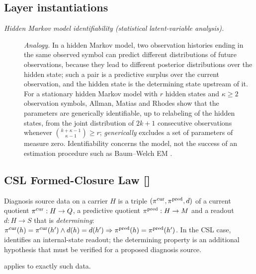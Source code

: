 \subsection*{Layer instantiations}\label{layer-inst:F13a}

\begingroup\small
\begin{description}
\item[\emph{Hidden Markov model identifiability (statistical
latent-variable analysis).}] \textit{Analogy.}
In a hidden Markov model, two observation histories ending in the
same observed symbol can predict different distributions of future
observations, because they lead to different posterior distributions
over the hidden state; such a pair is a predictive surplus over the
current observation, and the hidden state is the determining state
upstream of it.  For a stationary hidden Markov model with \(r\) hidden
states and \(\kappa\ge2\) observation symbols, Allman, Matias and
Rhodes show that the parameters are generically identifiable, up to
relabeling of the hidden states, from the joint distribution of
\(2k+1\) consecutive observations whenever
\(\binom{k+\kappa-1}{\kappa-1}\ge r\); \emph{generically}
excludes a set of parameters of measure zero.  Identifiability concerns
the model, not the success of an estimation procedure such as
Baum--Welch EM \citep{AllmanMatiasRhodes2009Identifiability}.

\end{description}
\endgroup


\subsection{CSL Formed-Closure Law [\texorpdfstring{}{F13b}]}\label{sec:access:csl-formed-closure}

\begin{definition}\label{def:diagnosis-source}
Diagnosis source data on a carrier \(H\) is a triple \((\pi^{\mathrm{cur}},\pi^{\mathrm{pred}},d)\) of
a current quotient \(\pi^{\mathrm{cur}}:H\to Q\), a predictive quotient
\(\pi^{\mathrm{pred}}:H\to M\) and a readout \(d:H\to S\) that is \emph{determining}:
\(\pi^{\mathrm{cur}}(h)=\pi^{\mathrm{cur}}(h')\wedge d(h)=d(h')\Rightarrow\pi^{\mathrm{pred}}(h)=\pi^{\mathrm{pred}}(h')\). In
the CSL case, \PaperCSL\ \citep{Tsiokos2026CSL} identifies an internal-state
readout; the determining property is an additional hypothesis that must be
verified for a proposed diagnosis source.
\end{definition}

 applies to exactly such data.

